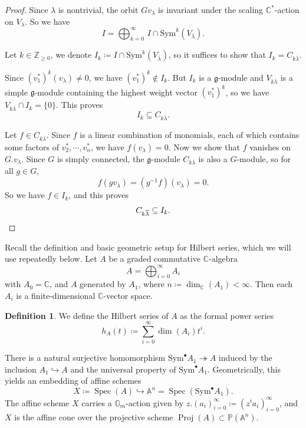 \documentclass[12pt]{extarticle}
\theoremstyle{plain}
\theoremstyle{definition}
\newtheorem{defi}[theo]{Definition}
\theoremstyle{remark}
\newcommand{\Lieg}{\mathfrak{g}}
\newcommand{\Sym}{\mathrm{Sym}}
\DeclareMathOperator{\Proj}{Proj}
\DeclareMathOperator{\Spec}{Spec}
\newcommand{\Z}{\mathbb{Z}}
\newcommand{\C}{\mathbb{C}}
\newcommand{\lambar}{{\overline{\lambda}}}
\begin{document}
\begin{proof}
	
Since $\lambda$ is nontrivial, the orbit $G v_\lambda$ is invariant under the scaling $\C^*$-action on $V_\lambda$. So we have
$$
	I=\bigoplus_{k=0}^{\infty}\,I\cap\Sym^k(V_\lambar).
$$

Let $k\in\Z_{\geq0}$, we denote $I_k\coloneqq I\cap\Sym^k(V_\lambar)$, so it suffices to show that $I_k=C_{k\lambar}$. 

Since $(v^*_1)^k(v_\lambda)\neq0$, we have $(v^*_1)^k\notin I_k$. But $I_k$ is a $\Lieg$-module and $V_{k\lambar}$ is a simple $\Lieg$-module containing the highest weight vector $(v^*_1)^k$, so we have 
$
	V_{k\lambar}\cap I_k=\{0\}.
$
This proves
$$
    I_k\subseteq C_{k\lambar}.
$$

Let $f\in C_{k\lambar}$. Since $f$ is a linear combination of monomials, each of which contains some factors of $v^*_2,\cdots,v^*_n$, we have $f(v_\lambda)=0$. Now we show that $f$ vanishes on $G.v_\lambda$. Since $G$ is simply connected, the $\Lieg$-module $C_{k\lambar}$ is also a $G$-module, so for all $g\in G$,
$$
    f(gv_\lambda)=(g^{-1}f)(v_\lambda)=0.
$$
So we have $f\in I_k$, and this proves
\[C_{k\lambar}\subseteq I_k.\qedhere\]
\end{proof}


Recall the definition and basic geometric setup for Hilbert series, which we will use repeatedly below.
Let $A$ be a graded commutative $\C$-algebra
 $$A=\bigoplus_{i=0}^{\infty}A_i$$
with $A_0=\C$, and $A$ generated by $A_1$, where $n\coloneqq\dim_\C(A_1)<\infty$. Then each $A_i$ is a finite-dimensional $\C$-vector space.
\begin{defi}
    We define the Hilbert series of $A$ as the formal power series
$$
    h_A(t)\coloneqq \sum_{i=0}^{\infty}\dim(A_i)t^i.
$$
\end{defi}
There is a natural surjective homomorphism $\Sym^\bullet A_1\twoheadrightarrow A$ induced by the inclusion $A_1\hookrightarrow A$ and the universal property of $\Sym^\bullet A_1$. Geometrically, this yields an embedding of affine schemes
$$
X\coloneqq\Spec(A)\hookrightarrow \mathbb{A}^n=\Spec(\Sym^\bullet A_1).
$$
The affine scheme $X$ carries a $\mathbb{G}_m$-action given by $z.(a_i)_{i=0}^\infty\coloneqq(z^ia_i)_{i=0}^\infty$, and $X$ is the affine cone over the projective scheme $\Proj(A)\subset \mathbb{P}(\mathbb{A}^n)$. 
\end{document}

